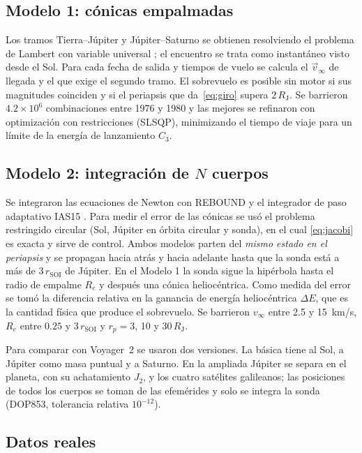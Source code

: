\documentclass[11pt,letterpaper]{article}
\newcommand{\RJ}{R_{\mathrm J}}
\newcommand{\vinf}{v_\infty}
\newcommand{\rsoi}{r_{\mathrm{SOI}}}
\begin{document}
\subsection{Modelo 1: cónicas empalmadas}

Los tramos Tierra--Júpiter y Júpiter--Saturno se obtienen resolviendo el problema de Lambert
con variable universal \cite{curtis2020}; el encuentro se trata como instantáneo visto desde el
Sol. Para cada fecha de salida y tiempos de vuelo se calcula el $\vec v_\infty$ de llegada y el
que exige el segundo tramo. El sobrevuelo es posible sin motor si sus magnitudes coinciden y si
el periapsis que da~\eqref{eq:giro} supera $2\,\RJ$. Se barrieron $4.2\times10^6$ combinaciones
entre 1976 y 1980 y las mejores se refinaron con optimización con restricciones (SLSQP),
minimizando el tiempo de viaje para un límite de la energía de lanzamiento $C_3$.

\subsection{Modelo 2: integración de $N$ cuerpos}

Se integraron las ecuaciones de Newton con REBOUND y el integrador de paso adaptativo IAS15
\cite{rein2012,rein2015}. Para medir el error de las cónicas se usó el problema restringido
circular (Sol, Júpiter en órbita circular y sonda), en el cual \eqref{eq:jacobi} es exacta y
sirve de control. Ambos modelos parten del \emph{mismo estado en el periapsis} y se propagan
hacia atrás y hacia adelante hasta que la sonda está a más de $3\,\rsoi$ de Júpiter. En el
Modelo 1 la sonda sigue la hipérbola hasta el radio de empalme $R_e$ y después una cónica
heliocéntrica. Como medida del error se tomó la diferencia relativa en la ganancia de energía
heliocéntrica $\Delta E$, que es la cantidad física que produce el sobrevuelo. Se barrieron
$\vinf$ entre 2.5 y 15~km/s, $R_e$ entre $0.25$ y $3\,\rsoi$ y $r_p = 3$, 10 y $30\,\RJ$.

Para comparar con Voyager~2 se usaron dos versiones. La básica tiene al Sol, a Júpiter como
masa puntual y a Saturno. En la ampliada Júpiter se separa en el planeta, con su achatamiento
$J_2$, y los cuatro satélites galileanos; las posiciones de todos los cuerpos se toman de las
efemérides y solo se integra la sonda (DOP853, tolerancia relativa $10^{-12}$).

\subsection{Datos reales}
\end{document}
